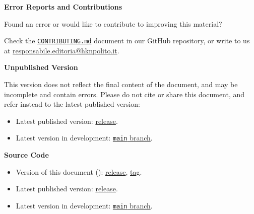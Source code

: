 {    \vspace{0.3cm}
    {\large\textbf{Error Reports and Contributions}}

    Found an error or would like to contribute to improving this material?

    Check the \href{https://github.com/MuNuChapterHKN/Eta-Kappa-Notes/blob/main/CONTRIBUTING.md}{\texttt{CONTRIBUTING.md}} document in our GitHub repository, or write to us at \href{mailto:responsabile.editoria@hknpolito.it}{responsabile.editoria@hknpolito.it}.

    \ifx\DDversion\empty
        {\color{red}
            \vspace{0.3cm}
            {\large\textbf{Unpublished Version}}

            This version does not reflect the final content of the document, and may be incomplete and contain errors.
            Please do not cite or share this document, and refer instead to the latest published version:
            \begin{itemize}
                \item Latest published version: \href{https://github.com/MuNuChapterHKN/Eta-Kappa-Notes/releases/latest}{release}.
                \item Latest version in development: \href{https://github.com/MuNuChapterHKN/Eta-Kappa-Notes/tree/main}{\texttt{main} branch}.
            \end{itemize}
        }
    \else
        \vspace{0.3cm}
        {\large\textbf{Source Code}}

        \begin{itemize}
            \item Version of this document (\DDversion): \href{https://github.com/MuNuChapterHKN/Eta-Kappa-Notes/releases/\DDversion}{release}, \href{https://github.com/MuNuChapterHKN/Eta-Kappa-Notes/tree/\DDversion}{tag}.
            \item Latest published version: \href{https://github.com/MuNuChapterHKN/Eta-Kappa-Notes/releases/latest}{release}.
            \item Latest version in development: \href{https://github.com/MuNuChapterHKN/Eta-Kappa-Notes/tree/main}{\texttt{main} branch}.
        \end{itemize}

        }
